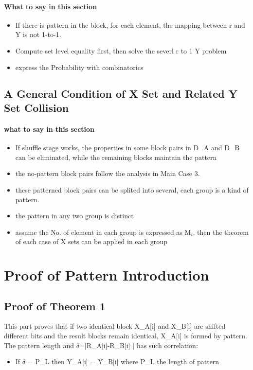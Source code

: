 \documentclass{article}
\begin{document}
\paragraph{What to say in this section}
\begin{itemize}
	\item If there is pattern in the block, for each element, the mapping between r and Y is not 1-to-1.
	\item Compute set level equality first, then solve the severl r to 1 Y problem
	\item express the Probability with combinatorics
\end{itemize}

\subsection{A General Condition of X Set and Related Y Set Collision}
\paragraph{what to say in this section}
\begin{itemize}
	\item If shuffle stage works, the properties in some block pairs in D\_A and D\_B can be eliminated, while the remaining blocks maintain the pattern
	\item the no-pattern block pairs follow the analysis in Main Case 3.
	\item these patterned block pairs can be splited into several, each group is a kind of pattern.
	\item the pattern in any two group is distinct
	\item assume the No. of element in each group is expressed as M$_i$, then the theorem of each case of X sets can be applied in each group
\end{itemize}

\appendix
\section{Proof of Pattern Introduction}
\subsection{Proof of Theorem 1}
This part proves that if two identical block X\_A[i]  and X\_B[i] are shifted different bits and the result blocks remain identical, X\_A[i] is formed by pattern. The pattern length and $\delta$=$\mid$R\_A[i]-R\_B[i] $\mid$ has such correlation:
\begin{itemize}
	\item If $\delta$ = P\_L then Y\_A[i] = Y\_B[i] where P\_L the length of pattern
\end{itemize}
\end{document}

